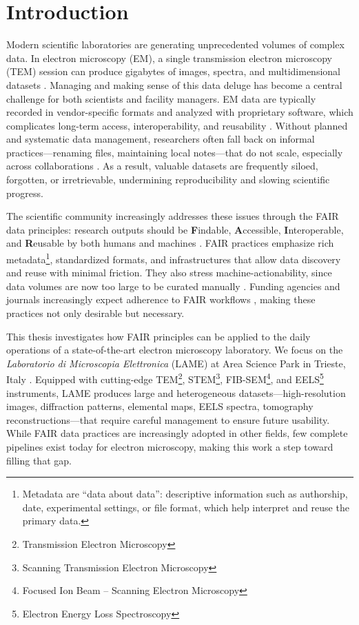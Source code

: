 \chapter{Introduction}

Modern scientific laboratories are generating unprecedented volumes of complex data. 
In electron microscopy (EM), a single transmission electron microscopy (TEM) session can produce gigabytes of images, spectra, and multidimensional datasets \parencite{Poger2023BigDataEM}. 
Managing and making sense of this data deluge has become a central challenge for both scientists and facility managers. 
EM data are typically recorded in vendor-specific formats and analyzed with proprietary software, which complicates long-term access, interoperability, and reusability \parencite{Moore2021OMENGFF}. 
Without planned and systematic data management, researchers often fall back on informal practices—renaming files, maintaining local notes—that do not scale, especially across collaborations \parencite{Korir2024TenRecs}. 
As a result, valuable datasets are frequently siloed, forgotten, or irretrievable, undermining reproducibility and slowing scientific progress.

The scientific community increasingly addresses these issues through the FAIR data principles: research outputs should be \textbf{F}indable, \textbf{A}ccessible, \textbf{I}nteroperable, and \textbf{R}eusable by both humans and machines \parencite{Wilkinson2016FAIR,GOFAIRPrinciples}. 
FAIR practices emphasize rich metadata\footnote{Metadata are “data about data”: descriptive information such as authorship, date, experimental settings, or file format, which help interpret and reuse the primary data.}, standardized formats, and infrastructures that allow data discovery and reuse with minimal friction. 
They also stress machine-actionability, since data volumes are now too large to be curated manually \parencite{Wilkinson2016FAIR}. 
Funding agencies and journals increasingly expect adherence to FAIR workflows \parencite{EC2018TurningFAIR,EC2021HEGuide}, making these practices not only desirable but necessary.

This thesis investigates how FAIR principles can be applied to the daily operations of a state-of-the-art electron microscopy laboratory. 
We focus on the \textit{Laboratorio di Microscopia Elettronica} (LAME) at Area Science Park in Trieste, Italy \parencite{AreaLAME}. 
Equipped with cutting-edge TEM\footnote{Transmission Electron Microscopy}, STEM\footnote{Scanning Transmission Electron Microscopy}, 
FIB-SEM\footnote{Focused Ion Beam – Scanning Electron Microscopy}, and EELS\footnote{Electron Energy Loss Spectroscopy} instruments, 
LAME produces large and heterogeneous datasets—high-resolution images, diffraction patterns, elemental maps, EELS spectra, tomography reconstructions—that require careful management to ensure future usability. 
While FAIR data practices are increasingly adopted in other fields, few complete pipelines exist today for electron microscopy, making this work a step toward filling that gap.

